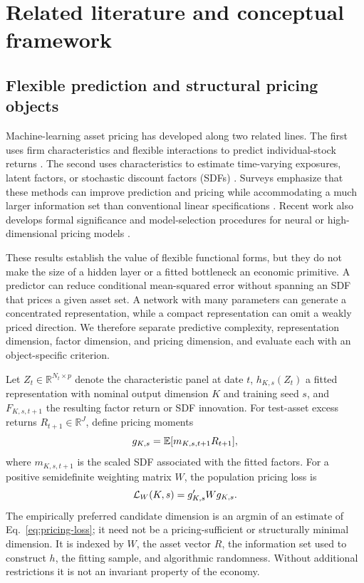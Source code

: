 \section{Related literature and conceptual framework}

\subsection{Flexible prediction and structural pricing objects}

Machine-learning asset pricing has developed along two related lines. The first uses firm characteristics and flexible interactions to predict individual-stock returns \citep{gu2020empirical,avramov2023machine,leippold2022machine}. The second uses characteristics to estimate time-varying exposures, latent factors, or stochastic discount factors (SDFs) \citep{kelly2019characteristics,gu2021autoencoder,chen2024deep,feng2024deep}. Surveys emphasize that these methods can improve prediction and pricing while accommodating a much larger information set than conventional linear specifications \citep{giglio2022factor,bagnara2024review,karolyi2020new}. Recent work also develops formal significance and model-selection procedures for neural or high-dimensional pricing models \citep{fallahgoul2024significance,feng2026stepwise}.

These results establish the value of flexible functional forms, but they do not make the size of a hidden layer or a fitted bottleneck an economic primitive. A predictor can reduce conditional mean-squared error without spanning an SDF that prices a given asset set. A network with many parameters can generate a concentrated representation, while a compact representation can omit a weakly priced direction. We therefore separate predictive complexity, representation dimension, factor dimension, and pricing dimension, and evaluate each with an object-specific criterion.

Let $Z_t\in\mathbb{R}^{N_t\times p}$ denote the characteristic panel at date $t$, $h_{K,s}(Z_t)$ a fitted representation with nominal output dimension $K$ and training seed $s$, and $F_{K,s,t+1}$ the resulting factor return or SDF innovation. For test-asset excess returns $R_{t+1}\in\mathbb{R}^{J}$, define pricing moments
\begin{equation}
 g_{K,s}=\mathbb{E}[m_{K,s,t+1}R_{t+1}],
\end{equation}
where $m_{K,s,t+1}$ is the scaled SDF associated with the fitted factors. For a positive semidefinite weighting matrix $W$, the population pricing loss is
\begin{equation}
 \mathcal{L}_W(K,s)=g_{K,s}'Wg_{K,s}.
 \label{eq:pricing-loss}
\end{equation}
The empirically preferred candidate dimension is an argmin of an estimate of Eq.~\eqref{eq:pricing-loss}; it need not be a pricing-sufficient or structurally minimal dimension. It is indexed by $W$, the asset vector $R$, the information set used to construct $h$, the fitting sample, and algorithmic randomness. Without additional restrictions it is not an invariant property of the economy.

